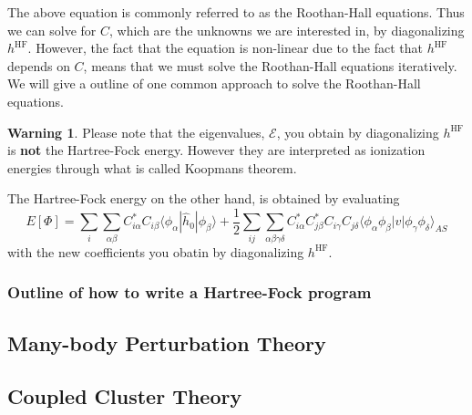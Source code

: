 \documentclass[a4paper,10pt]{article}
\newcommand{\braket}[1]{\langle#1\rangle}
\theoremstyle{definition}
\newtheorem{warning}{Warning}
\begin{document}
The above equation is commonly referred to as the Roothan-Hall equations. Thus we can solve for $C$, which 
are the unknowns we are interested in, by diagonalizing $h^\text{HF}$. However, the fact that the equation is non-linear
due to the fact that $h^{\text{HF}}$ depends on $C$, means that we must solve the Roothan-Hall equations iteratively.
We will give a outline of one common approach to solve the Roothan-Hall equations.

\begin{warning}
 Please note that the eigenvalues, $\mathcal{E}$, you obtain by diagonalizing $h^\text{HF}$ is \textbf{not} 
 the Hartree-Fock energy. However they are interpreted as ionization energies through what is called Koopmans theorem.
 
 The Hartree-Fock energy on the other hand, is obtained by evaluating 
 \begin{equation}
  E[\Phi] = \sum_i \sum_{\alpha \beta} C^*_{i \alpha}C_{i \beta} \braket{\phi_\alpha|\hat{h}_0|\phi_\beta} + \frac{1}{2} \sum_{ij} \sum_{\alpha \beta \gamma \delta} C^*_{i \alpha} C^*_{j \beta} C_{i \gamma} C_{j \delta} \braket{\phi_\alpha \phi_\beta|v|\phi_\gamma \phi_\delta}_{AS}
 \end{equation}
  with the new coefficients you obatin by diagonalizing $h^\text{HF}$.
\end{warning}



\subsubsection{Outline of how to write a Hartree-Fock program}




\subsection{Many-body Perturbation Theory}

\subsection{Coupled Cluster Theory}
\end{document}
